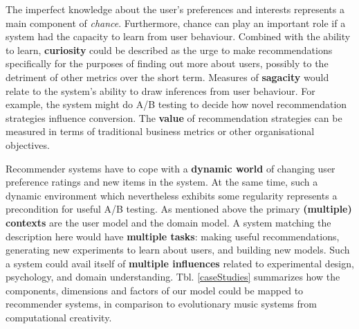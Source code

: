 The imperfect knowledge about the user's preferences and interests represents a main component of \emph{chance}. Furthermore, chance can play an important role if a system had the capacity to learn from user behaviour. Combined with the ability to learn, \textbf{curiosity} could be described as the urge to make recommendations specifically for the purposes of finding out more about users, possibly to the detriment of other metrics over the short term. Measures of \textbf{sagacity} would relate to the system's ability to draw inferences from user behaviour.  For example, the system might do A/B testing to decide how novel recommendation strategies influence conversion.  The \textbf{value} of recommendation strategies can be measured in terms of traditional business metrics or other organisational objectives.

Recommender systems have to cope with a \textbf{dynamic world} of changing user preference ratings and new items in the system. At the same time, such a dynamic environment which nevertheless exhibits some regularity represents a precondition for useful A/B testing.  As mentioned above the primary \textbf{(multiple) contexts} are the user model and the domain model. A system matching the description here would have \textbf{multiple tasks}: making useful recommendations, generating new experiments to learn about users, and building new models. Such a system could avail itself of \textbf{multiple influences} related to
experimental design, psychology, and domain understanding. Tbl. \ref{caseStudies} summarizes how the components, dimensions and factors of our model could be mapped to recommender systems, in comparison to evolutionary music systems from computational creativity.






